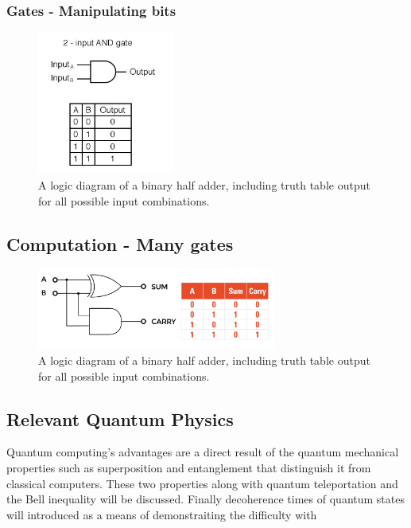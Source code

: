 \subsubsection{Gates - Manipulating bits}
\begin{figure}[H]
    \centering
    \includegraphics[width=0.4\textwidth]{images/andgate.jpeg}
    \caption{A logic diagram of a binary half adder, including truth table output for all possible input combinations. \cite{andgate}}\label{fig:ANDGATE}
\end{figure}
\subsection{Computation - Many gates}
\begin{figure}[H]
    \centering
    \includegraphics[width=0.7\textwidth]{images/adder.jpeg}
    \caption{A logic diagram of a binary half adder, including truth table output for all possible input combinations. \cite{adder}}\label{fig:ADDER}
\end{figure}

\subsection{Relevant Quantum Physics}

Quantum computing's advantages are a direct result of the quantum mechanical properties such as superposition and entanglement that distinguish it from classical computers. 
These two properties along with quantum teleportation and the Bell inequality will be discussed.
Finally decoherence times of quantum states will introduced as a means of demonstraiting the difficulty with 

